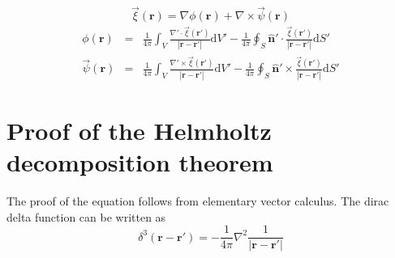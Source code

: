 \documentclass[12pt, a4paper]{report}
\begin{document}
\begin{equation}\label{decomp}
    \vec{\xi}(\mathbf {r}) = \nabla \phi(\mathbf {r}) + \nabla \times \vec{\psi}(\mathbf {r})
\end{equation}
\begin{eqnarray}
    \displaystyle {\phi }(\mathbf {r} )&=&{\frac {1}{4\pi }}\int _{V}{\frac {\nabla '\cdot \vec{\xi} \left(\mathbf {r} '\right)}{\left|\mathbf {r} -\mathbf {r} '\right|}}\mathrm {d} V'-{\frac {1}{4\pi }}\oint _{S}\mathbf {\hat {n}} '\cdot {\frac {\vec{\xi} \left(\mathbf {r} '\right)}{\left|\mathbf {r} -\mathbf {r} '\right|}}\mathrm {d} S'\\
	\vec {\psi} (\mathbf {r} )&=&{\frac {1}{4\pi }}\int _{V}{\frac {\nabla '\times \vec{\xi} \left(\mathbf {r} '\right)}{\left|\mathbf {r} -\mathbf {r} '\right|}}\mathrm {d} V'-{\frac {1}{4\pi }}\oint _{S}\mathbf {\hat {n}} '\times {\frac {\vec{\xi} \left(\mathbf {r} '\right)}{\left|\mathbf {r} -\mathbf {r} '\right|}}\mathrm {d} S'
\end{eqnarray}

\section{Proof of the Helmholtz decomposition theorem}

The proof of the equation follows from elementary vector calculus. The dirac delta function can be written as
\begin{equation*}
\delta ^{3}(\mathbf {r} -\mathbf {r} ')=-{\frac {1}{4\pi }}\nabla ^{2}{\frac {1}{\left|\mathbf {r} -\mathbf {r} '\right|}}
\end{equation*}
\end{document}
